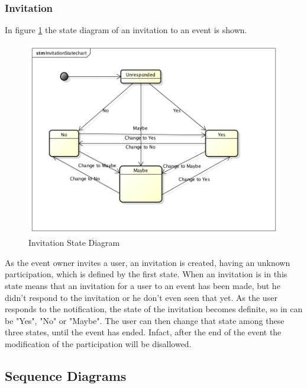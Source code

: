 \subsubsection{Invitation}
In figure \ref{fig:invstatediagram} the state diagram of an invitation to an event is shown.
 \begin{center}
 \begin{figure}[H]
    \includegraphics[width=1\textwidth ]{../UMLDiagram/InvitationStatechart/InvitationStatechart.png}
    \caption{Invitation State Diagram}
     \label{fig:invstatediagram}
     \end{figure}
   \end{center}
As the event owner invites a user, an invitation is created, having an unknown participation, which is defined by the first state. When an invitation is in this state means that an invitation for a user to an event has been made, but he didn't respond to the invitation or he don't even seen that yet. As the user responds to the notification, the state of the invitation becomes definite, so in can be "Yes", "No" or "Maybe". The user can then change that state among these three states, until the event has ended. Infact, after the end of the event the modification of the participation will be disallowed.
 \subsection{Sequence Diagrams}
